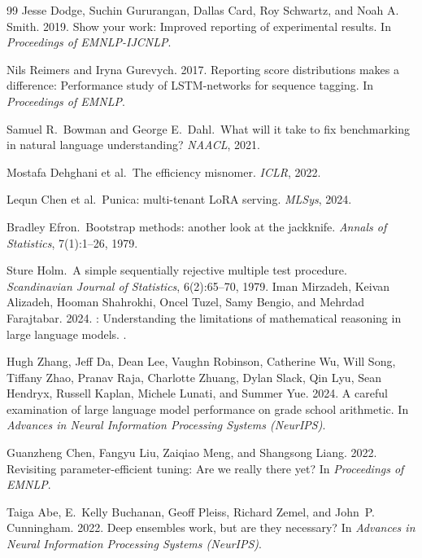 \documentclass[11pt]{article}
\begin{document}
\begin{thebibliography}{99}
Jesse Dodge, Suchin Gururangan, Dallas Card, Roy Schwartz, and Noah A. Smith. 2019.
\newblock Show your work: Improved reporting of experimental results.
\newblock In {\em Proceedings of EMNLP-IJCNLP}.

Nils Reimers and Iryna Gurevych. 2017.
\newblock Reporting score distributions makes a difference: Performance study of LSTM-networks for sequence tagging.
\newblock In {\em Proceedings of EMNLP}.

Samuel R.\ Bowman and George E.\ Dahl.\ What will it take to fix benchmarking in natural language understanding? \emph{NAACL}, 2021.

Mostafa Dehghani et al.\ The efficiency misnomer. \emph{ICLR}, 2022.

Lequn Chen et al.\ Punica: multi-tenant LoRA serving. \emph{MLSys}, 2024.

Bradley Efron.\ Bootstrap methods: another look at the jackknife. \emph{Annals of Statistics}, 7(1):1--26, 1979.

Sture Holm.\ A simple sequentially rejective multiple test procedure. \emph{Scandinavian Journal of Statistics}, 6(2):65--70, 1979.
Iman Mirzadeh, Keivan Alizadeh, Hooman Shahrokhi, Oncel Tuzel, Samy Bengio, and Mehrdad Farajtabar. 2024.
: Understanding the limitations of mathematical reasoning in large language models.
.

Hugh Zhang, Jeff Da, Dean Lee, Vaughn Robinson, Catherine Wu, Will Song, Tiffany Zhao,
Pranav Raja, Charlotte Zhuang, Dylan Slack, Qin Lyu, Sean Hendryx, Russell Kaplan,
Michele Lunati, and Summer Yue. 2024.
\newblock A careful examination of large language model performance on grade school arithmetic.
\newblock In {\em Advances in Neural Information Processing Systems (NeurIPS)}.

Guanzheng Chen, Fangyu Liu, Zaiqiao Meng, and Shangsong Liang. 2022.
\newblock Revisiting parameter-efficient tuning: Are we really there yet?
\newblock In {\em Proceedings of EMNLP}.

Taiga Abe, E.~Kelly Buchanan, Geoff Pleiss, Richard Zemel, and John~P. Cunningham. 2022.
\newblock Deep ensembles work, but are they necessary?
\newblock In {\em Advances in Neural Information Processing Systems (NeurIPS)}.


\end{thebibliography}
\end{document}
